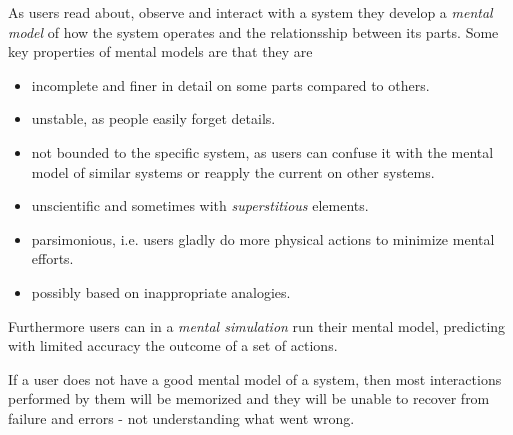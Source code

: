 \begin{concept} \label{conc:mental_model} 
  As users read about, observe and interact with a system they develop a \emph{mental model} of how the system operates and the relationsship between its parts. Some key properties of mental models are that they are
  \begin{itemize}
    \item incomplete and finer in detail on some parts compared to others.
    \item unstable, as people easily forget details.
    \item not bounded to the specific system, as users can confuse it with the mental model of similar systems or reapply the current on other systems.
    \item unscientific and sometimes with \emph{superstitious} elements.
    \item parsimonious, i.e. users gladly do more physical actions to minimize mental efforts.
    \item possibly based on inappropriate analogies.
  \end{itemize}
  Furthermore users can in a \emph{mental simulation} run their mental model, predicting with limited accuracy the outcome of a set of actions. \cite[p. 31-32]{benyon14} \cite[p. 86-88]{rogers} 

  If a user does not have a good mental model of a system, then most interactions performed by them will be memorized and they will be unable to recover from failure and errors - not understanding what went wrong. \cite[p. 31-32]{benyon14}
\end{concept}